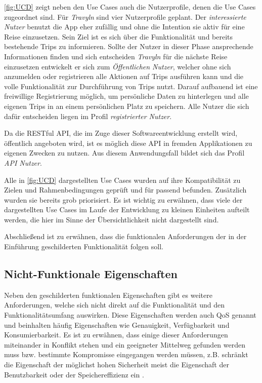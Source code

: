 \vspace{0.25cm}

\autoref{fig:UCD} zeigt neben den Use Cases auch die Nutzerprofile, denen die Use Cases zugeordnet sind. Für \textit{Travyln} sind vier Nutzerprofile geplant. Der \textit{interessierte Nutzer} benutzt die App eher zufällig und ohne die Intention sie aktiv für eine Reise einzusetzen. Sein Ziel ist es sich über die Funktionalität und bereits bestehende Trips zu informieren. Sollte der Nutzer in dieser Phase ansprechende Informationen finden und sich entscheiden \textit{Travyln} für die nächste Reise einzusetzen entwickelt er sich zum \textit{Öffentlichen Nutzer}, welcher ohne sich anzumelden oder registrieren alle Aktionen auf Trips ausführen kann und die volle Funktionalität zur Durchführung von Trips nutzt. Darauf aufbauend ist eine freiwillige Registrierung möglich, um persönliche Daten zu hinterlegen und alle eigenen Trips in an einem persönlichen Platz zu speichern. Alle Nutzer die sich dafür entscheiden liegen im Profil \textit{registrierter Nutzer}.

\vspace{0.25cm}

Da die RESTful API, die im Zuge dieser Softwareentwicklung erstellt wird, öffentlich angeboten wird, ist es möglich diese API in fremden Applikationen zu eigenen Zwecken zu nutzen. Aus diesem Anwendungsfall bildet sich das Profil \textit{API Nutzer}.

\vspace{0.25cm}

 
Alle in \autoref{fig:UCD} dargestellten Use Cases wurden auf ihre Kompatibilität zu Zielen und Rahmenbedingungen geprüft und für passend befunden. Zusätzlich wurden sie bereits grob priorisiert. Es ist wichtig zu erwähnen, dass viele der dargestellten Use Cases im Laufe der Entwicklung zu kleinen Einheiten aufteilt werden, die hier im Sinne der Übersichtlichkeit nicht dargestellt sind.



Abschließend ist zu erwähnen, dass die funktionalen Anforderungen der in der Einführung geschilderten Funktionalität folgen soll.

\subsection{Nicht-Funktionale Eigenschaften}
Neben den geschilderten funktionalen Eigenschaften gibt es weitere Anforderungen, welche sich nicht direkt auf die Funktionalität und den Funktionalitätsumfang auswirken. Diese Eigenschaften werden auch \ac{QoS} genannt und beinhalten häufig Eigenschaften wie  Genauigkeit, Verfügbarkeit und  Konsumierbarkeit. Es ist zu erwähnen, dass einige dieser Anforderungen miteinander in Konflikt stehen und ein geeigneter Mittelweg gefunden werden muss bzw. bestimmte Kompromisse eingegangen werden müssen, z.B. schränkt die Eigenschaft der möglichst hohen Sicherheit meist die Eigenschaft der Benutzbarkeit oder der Speichereffizienz ein \cite{Balzert.2009}.  

